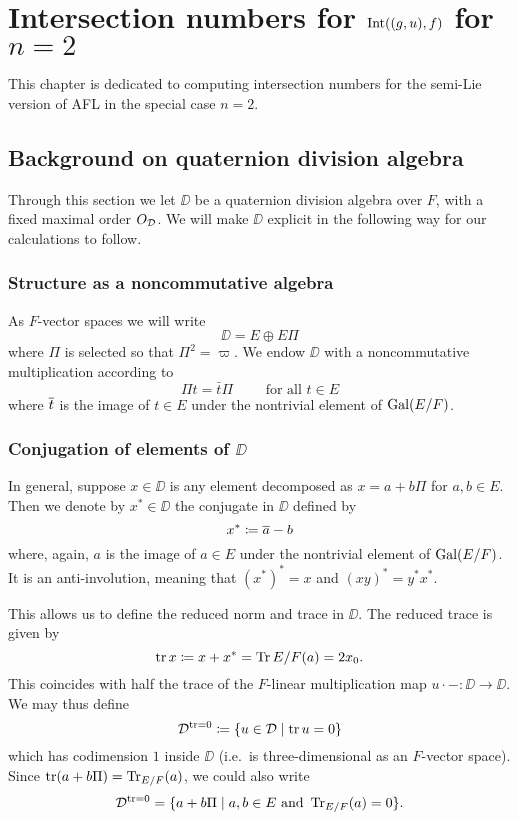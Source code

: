 \chapter{Intersection numbers for $\operatorname{Int}((g,u), f)$ for $n = 2$}
\label{ch:jiao}
This chapter is dedicated to computing intersection numbers
for the semi-Lie version of AFL in the special case $n = 2$.

\section{Background on quaternion division algebra}
Through this section we let $\DD$ be a quaternion division algebra over $F$,
with a fixed maximal order $O_\mathcal D$.
We will make $\DD$ explicit in the following way for our calculations to follow.

\subsection{Structure as a noncommutative algebra}
As $F$-vector spaces we will write
\[ \DD = E \oplus E \Pi \]
where $\Pi$ is selected so that $\Pi^2 = \varpi$.
We endow $\DD$ with a noncommutative multiplication according to
\[ \Pi t = \bar t \Pi \qquad \text{ for all } t \in E \]
where $\overline{t}$ is the image of $t \in E$ under the nontrivial element of $\operatorname{Gal}(E/F)$.

\subsection{Conjugation of elements of $\DD$}
In general, suppose $x \in \DD$ is any element
decomposed as $x = a + b \Pi$ for $a,b \in E$.
Then we denote by $x^\ast \in \DD$ the conjugate in $\DD$ defined by
\[ x^\ast \coloneqq \overline{a} - b \]
where, again, $a$ is the image of $a \in E$ under the nontrivial element of $\operatorname{Gal}(E/F)$.
It is an anti-involution, meaning that $(x^\ast)^\ast = x$ and $(xy)^\ast = y^\ast x^\ast$.

This allows us to define the reduced norm and trace in $\DD$.
The reduced trace is given by
\[ \operatorname{tr} x \coloneqq x + x^\ast = \operatorname{Tr}{E/F}(a) = 2x_0. \]
This coincides with half the trace of the
$F$-linear multiplication map $u \cdot - \colon \DD \to \DD$.
We may thus define
\[ \mathcal D^{\operatorname{tr} = 0} \coloneqq \left\{ u \in \mathcal D \mid \operatorname{tr} u = 0 \right\} \]
which has codimension $1$ inside $\DD$ (i.e.\ is three-dimensional as an $F$-vector space).
Since $\operatorname{tr}(a+b\Pi) = \operatorname{Tr}_{E/F}(a)$, we could also write
\[ \mathcal D^{\operatorname{tr} = 0} = \{ a+b\Pi \mid a,b \in E \text{ and } \operatorname{Tr}_{E/F}(a) = 0 \}. \]

